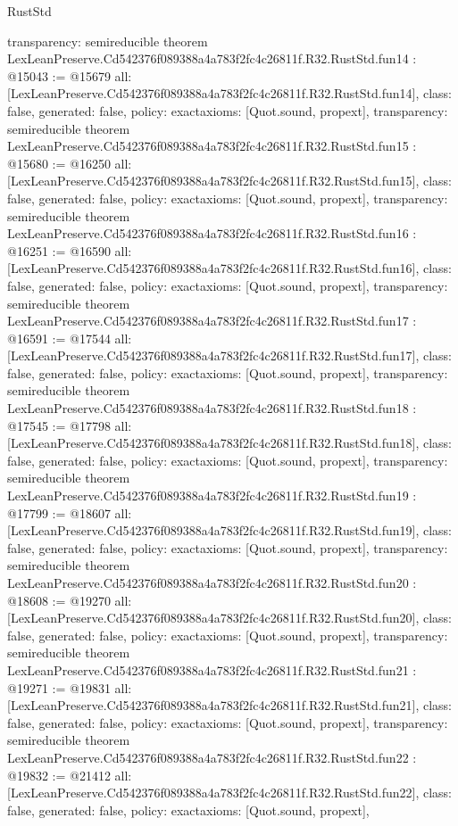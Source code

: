 \begin{lexlean}{RustStd}
\begin{coremodule}
{  transparency: semireducible
}
theorem LexLeanPreserve.Cd542376f089388a4a783f2fc4c26811f.R32.RustStd.fun14 : @15043 := @15679 {
  all: [LexLeanPreserve.Cd542376f089388a4a783f2fc4c26811f.R32.RustStd.fun14],
  class: false,
  generated: false,
  policy: exact{axioms: [Quot.sound, propext]},
  transparency: semireducible
}
theorem LexLeanPreserve.Cd542376f089388a4a783f2fc4c26811f.R32.RustStd.fun15 : @15680 := @16250 {
  all: [LexLeanPreserve.Cd542376f089388a4a783f2fc4c26811f.R32.RustStd.fun15],
  class: false,
  generated: false,
  policy: exact{axioms: [Quot.sound, propext]},
  transparency: semireducible
}
theorem LexLeanPreserve.Cd542376f089388a4a783f2fc4c26811f.R32.RustStd.fun16 : @16251 := @16590 {
  all: [LexLeanPreserve.Cd542376f089388a4a783f2fc4c26811f.R32.RustStd.fun16],
  class: false,
  generated: false,
  policy: exact{axioms: [Quot.sound, propext]},
  transparency: semireducible
}
theorem LexLeanPreserve.Cd542376f089388a4a783f2fc4c26811f.R32.RustStd.fun17 : @16591 := @17544 {
  all: [LexLeanPreserve.Cd542376f089388a4a783f2fc4c26811f.R32.RustStd.fun17],
  class: false,
  generated: false,
  policy: exact{axioms: [Quot.sound, propext]},
  transparency: semireducible
}
theorem LexLeanPreserve.Cd542376f089388a4a783f2fc4c26811f.R32.RustStd.fun18 : @17545 := @17798 {
  all: [LexLeanPreserve.Cd542376f089388a4a783f2fc4c26811f.R32.RustStd.fun18],
  class: false,
  generated: false,
  policy: exact{axioms: [Quot.sound, propext]},
  transparency: semireducible
}
theorem LexLeanPreserve.Cd542376f089388a4a783f2fc4c26811f.R32.RustStd.fun19 : @17799 := @18607 {
  all: [LexLeanPreserve.Cd542376f089388a4a783f2fc4c26811f.R32.RustStd.fun19],
  class: false,
  generated: false,
  policy: exact{axioms: [Quot.sound, propext]},
  transparency: semireducible
}
theorem LexLeanPreserve.Cd542376f089388a4a783f2fc4c26811f.R32.RustStd.fun20 : @18608 := @19270 {
  all: [LexLeanPreserve.Cd542376f089388a4a783f2fc4c26811f.R32.RustStd.fun20],
  class: false,
  generated: false,
  policy: exact{axioms: [Quot.sound, propext]},
  transparency: semireducible
}
theorem LexLeanPreserve.Cd542376f089388a4a783f2fc4c26811f.R32.RustStd.fun21 : @19271 := @19831 {
  all: [LexLeanPreserve.Cd542376f089388a4a783f2fc4c26811f.R32.RustStd.fun21],
  class: false,
  generated: false,
  policy: exact{axioms: [Quot.sound, propext]},
  transparency: semireducible
}
theorem LexLeanPreserve.Cd542376f089388a4a783f2fc4c26811f.R32.RustStd.fun22 : @19832 := @21412 {
  all: [LexLeanPreserve.Cd542376f089388a4a783f2fc4c26811f.R32.RustStd.fun22],
  class: false,
  generated: false,
  policy: exact{axioms: [Quot.sound, propext]},
}
\end{coremodule}
\end{lexlean}
